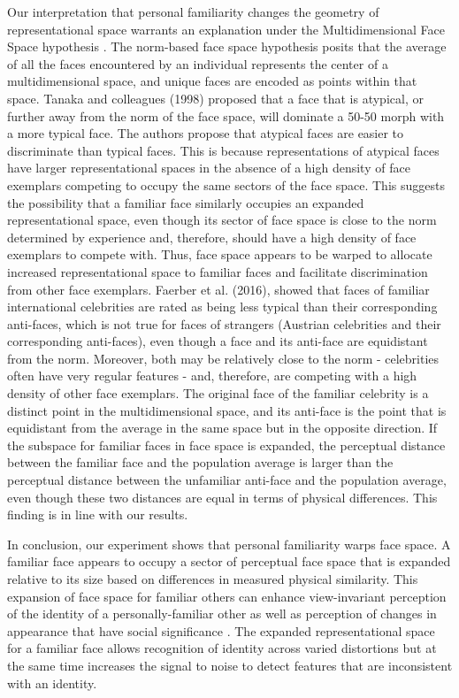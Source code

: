 \documentclass[10pt,letterpaper]{article}
\begin{document}
Our interpretation that personal familiarity changes the geometry of representational space warrants an explanation under the Multidimensional Face Space hypothesis \cite{valentine1991unified}. The norm-based face space hypothesis posits that the average of all the faces encountered by an individual represents the center of a multidimensional space, and unique faces are encoded as points within that space. Tanaka and colleagues (1998)\cite{tanaka1998mapping} proposed that a face that is atypical, or further away from the norm of the face space, will dominate a 50-50 morph with a more typical face. The authors propose that atypical faces are easier to discriminate than typical faces. This is because representations of atypical faces have larger representational spaces in the absence of a high density of face exemplars competing to occupy the same sectors of the face space. This suggests the possibility that a familiar face similarly occupies an expanded representational space, even though its sector of face space is close to the norm determined by experience and, therefore, should have a high density of face exemplars to compete with.  Thus, face space appears to be warped to allocate increased representational space to familiar faces and facilitate discrimination from other face exemplars. Faerber et al. (2016)\cite{faerber2016role}, showed that faces of familiar international celebrities are rated as being less typical than their corresponding anti-faces, which is not true for faces of strangers (Austrian celebrities and their corresponding anti-faces), even though a face and its anti-face are equidistant from the norm.  Moreover, both may be relatively close to the norm - celebrities often have very regular features - and, therefore, are competing with a high density of other face exemplars. The original face of the familiar celebrity is a distinct point in the multidimensional space, and its anti-face is the point that is equidistant from the average in the same space but in the opposite direction. If the subspace for familiar faces in face space is expanded, the perceptual distance between the familiar face and the population average is larger than the perceptual distance between the unfamiliar anti-face and the population average, even though these two distances are equal in terms of physical differences. This finding is in line with our results. 

In conclusion, our experiment shows that personal familiarity warps face space. A familiar face appears to occupy a sector of perceptual face space that is expanded relative to its size based on differences in measured physical similarity.  This expansion of face space for familiar others can enhance view-invariant perception of the identity of a personally-familiar other \cite{jenkins2011variability} as well as perception of changes in appearance that have social significance \cite{visconti2014facilitated, chauhan2017social}. The expanded representational space for a familiar face allows recognition of identity across varied distortions but at the same time increases the signal to noise to detect features that are inconsistent with an identity.
\end{document}
